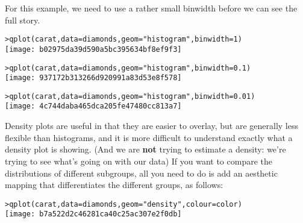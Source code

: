 For this example, we need to use a rather small binwidth before we can see the full story.

\begin{alltt}
> qplot(carat, data = diamonds, geom = "histogram", binwidth = 1)
\texttt{[image: b02975da39d590a5bc395634bf8ef9f3]}

> qplot(carat, data = diamonds, geom = "histogram", binwidth = 0.1)
\texttt{[image: 937172b313266d920991a83d53e8f578]}

> qplot(carat, data = diamonds, geom = "histogram", binwidth = 0.01)
\texttt{[image: 4c744daba465dca205fe47480cc813a7]}

\end{alltt}

Density plots are useful in that they are easier to overlay, but are generally less flexible than histograms, and it is more difficult to understand exactly what a density plot is showing.  (And we are {\bf not} trying to estimate a density: we're trying to see what's going on with our data)  If you want to compare the distributions of different subgroups, all you need to do is add an aesthetic mapping that differentiates the different groups, as follows:

\begin{alltt}
> qplot(carat, data = diamonds, geom = "density", colour = color)
\texttt{[image: b7a522d2c46281ca40c25ac307e2f0db]}

\end{alltt}

